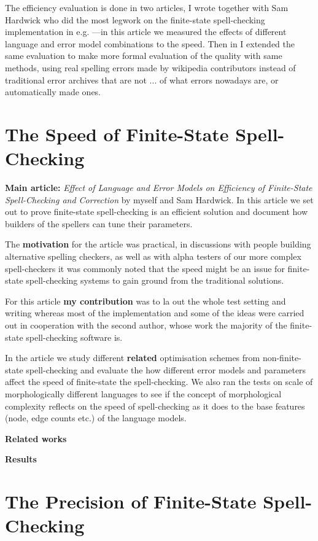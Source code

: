 \documentclass[officiallayout,draft]{unihelcompling}
\begin{document}
The efficiency evaluation is done in two articles, \cite{} I wrote together
with Sam Hardwick who did the most legwork on the finite-state spell-checking
implementation in e.g. \cite{}---in this article we measured the effects
of different language and error model combinations to the speed. Then in
\cite{} I extended the same evaluation to make more formal evaluation of the
quality with same methods, using real spelling errors made by wikipedia
contributors instead of traditional error archives that are not ... of what
errors nowadays are, or automatically made ones.

\section{The Speed of Finite-State Spell-Checking}

\textbf{Main article:} \emph{Effect of Language and Error Models on Efficiency
of Finite-State Spell-Checking and Correction} by myself and Sam Hardwick. In
this article we set out to prove finite-state spell-checking is an efficient
solution and document how builders of the spellers can tune their parameters.

The \textbf{motivation} for the article was practical, in discussions with
people building alternative spelling checkers, as well as with alpha testers of
our more complex spell-checkers it was commonly noted that the speed might be
an issue for finite-state spell-checking systems to gain ground from the
traditional solutions. 

For this article \textbf{my contribution} was to la out the whole test setting
and writing whereas most of the implementation and some of the ideas were
carried out in cooperation with the second author, whose work the majority
of the finite-state spell-checking software is.

In the article we study different \textbf{related} optimisation schemes from
non-finite-state spell-checking and evaluate the how different error models and
parameters affect the speed of finite-state the spell-checking. We also ran the
tests on scale of morphologically different languages to see if the concept of
morphological complexity reflects on the speed of spell-checking as it does to
the base features (node, edge counts etc.) of the language models.

\textbf{Related works}

\textbf{Results}

\section{The Precision of Finite-State Spell-Checking}
\end{document}
